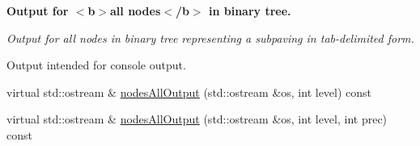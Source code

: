 \begin{Indent}{\bf \-Output for $<$b$>$all nodes$<$/b$>$ in binary tree.}\par
{\em \-Output for all nodes in binary tree representing a subpaving in tab-\/delimited form.

\-Output intended for console output. }\begin{DoxyCompactItemize}
\item 
virtual std\-::ostream \& \hyperlink{classsubpavings_1_1SPnode_ab75be88517039e1b426333dbc3764f10}{nodes\-All\-Output} (std\-::ostream \&os, int level) const 
\item 
virtual std\-::ostream \& \hyperlink{classsubpavings_1_1SPnode_a7408768856a7c988d9784b6172d74310}{nodes\-All\-Output} (std\-::ostream \&os, int level, int prec) const 
\end{DoxyCompactItemize}
\end{Indent}

